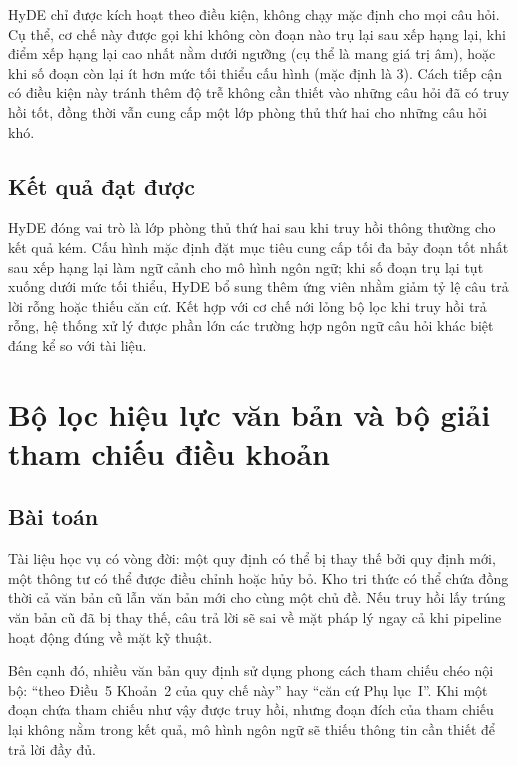 \documentclass[../DoAn.tex]{subfiles}
\begin{document}
HyDE chỉ được kích hoạt theo điều kiện, không chạy mặc định cho mọi câu hỏi.
Cụ thể, cơ chế này được gọi khi không còn đoạn nào trụ lại sau xếp hạng lại,
khi điểm xếp hạng lại cao nhất nằm dưới ngưỡng (cụ thể là mang giá trị âm),
hoặc khi số đoạn còn lại ít hơn mức tối thiểu cấu hình (mặc định là 3). Cách
tiếp cận có điều kiện này tránh thêm độ trễ không cần thiết vào những câu hỏi
đã có truy hồi tốt, đồng thời vẫn cung cấp một lớp phòng thủ thứ hai cho những
câu hỏi khó.

\subsection{Kết quả đạt được}

HyDE đóng vai trò là lớp phòng thủ thứ hai sau khi truy hồi thông thường cho
kết quả kém. Cấu hình mặc định đặt mục tiêu cung cấp tối đa bảy đoạn tốt nhất
sau xếp hạng lại làm ngữ cảnh cho mô hình ngôn ngữ; khi số đoạn trụ lại tụt
xuống dưới mức tối thiểu, HyDE bổ sung thêm ứng viên nhằm giảm tỷ lệ câu trả
lời rỗng hoặc thiếu căn cứ. Kết hợp với cơ chế nới lỏng bộ lọc khi truy hồi
trả rỗng, hệ thống xử lý được phần lớn các trường hợp ngôn ngữ câu hỏi khác
biệt đáng kể so với tài liệu.

\section{Bộ lọc hiệu lực văn bản và bộ giải tham chiếu điều khoản}
\label{sec:ch5-validity}

\subsection{Bài toán}

Tài liệu học vụ có vòng đời: một quy định có thể bị thay thế bởi quy định mới,
một thông tư có thể được điều chỉnh hoặc hủy bỏ. Kho tri thức có thể chứa đồng
thời cả văn bản cũ lẫn văn bản mới cho cùng một chủ đề. Nếu truy hồi lấy trúng
văn bản cũ đã bị thay thế, câu trả lời sẽ sai về mặt pháp lý ngay cả khi
pipeline hoạt động đúng về mặt kỹ thuật.

Bên cạnh đó, nhiều văn bản quy định sử dụng phong cách tham chiếu chéo nội bộ:
``theo Điều~5 Khoản~2 của quy chế này'' hay ``căn cứ Phụ lục~I''. Khi một đoạn
chứa tham chiếu như vậy được truy hồi, nhưng đoạn đích của tham chiếu lại không
nằm trong kết quả, mô hình ngôn ngữ sẽ thiếu thông tin cần thiết để trả lời đầy
đủ.
\end{document}
